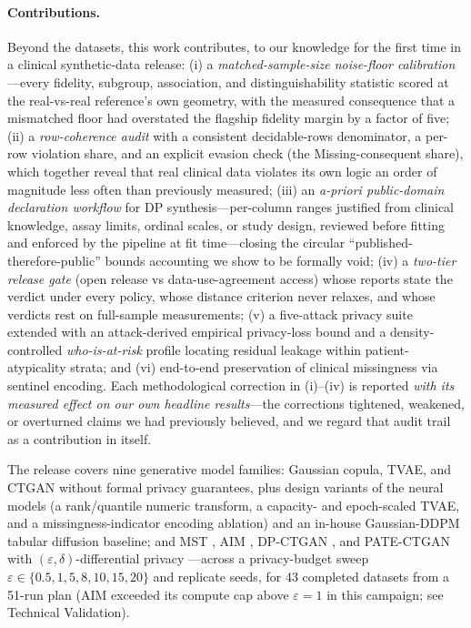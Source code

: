 \documentclass[11pt,a4paper]{article}
\newcommand{\eps}{\ensuremath{\varepsilon}}
\begin{document}
\paragraph{Contributions.} Beyond the datasets, this work contributes, to our
knowledge for the first time in a clinical synthetic-data release: (i) a
\emph{matched-sample-size noise-floor calibration}---every fidelity, subgroup,
association, and distinguishability statistic scored at the real-vs-real
reference's own geometry, with the measured consequence that a mismatched floor
had overstated the flagship fidelity margin by a factor of five; (ii) a
\emph{row-coherence audit} with a consistent decidable-rows denominator, a
per-row violation share, and an explicit evasion check (the Missing-consequent
share), which together reveal that real clinical data violates its own logic an
order of magnitude less often than previously measured; (iii) an
\emph{a-priori public-domain declaration workflow} for DP synthesis---per-column
ranges justified from clinical knowledge, assay limits, ordinal scales, or study
design, reviewed before fitting and enforced by the pipeline at fit
time---closing the circular ``published-therefore-public'' bounds accounting we
show to be formally void; (iv) a \emph{two-tier release gate} (open release vs
data-use-agreement access) whose reports state the verdict under every policy,
whose distance criterion never relaxes, and whose verdicts rest on full-sample
measurements; (v) a five-attack privacy suite extended with an attack-derived
empirical privacy-loss bound and a density-controlled \emph{who-is-at-risk}
profile locating residual leakage within patient-atypicality strata; and (vi)
end-to-end preservation of clinical missingness via sentinel encoding. Each
methodological correction in (i)--(iv) is reported \emph{with its measured
effect on our own headline results}---the corrections tightened, weakened, or
overturned claims we had previously believed, and we regard that audit trail as
a contribution in itself.

The release covers nine generative model families: Gaussian copula, TVAE, and CTGAN
\citep{patki2016sdv, xu2019modeling} without formal privacy guarantees, plus
design variants of the neural models (a rank/quantile numeric transform, a
capacity- and epoch-scaled TVAE, and a missingness-indicator encoding ablation)
and an in-house Gaussian-DDPM tabular diffusion baseline; and MST
\citep{mckenna2021winning}, AIM \citep{mckenna2022aim}, DP-CTGAN
\citep{rosenblatt2020differentially}, and PATE-CTGAN with
$(\eps, \delta)$-differential privacy \citep{dwork2014algorithmic}---across a
privacy-budget sweep $\eps \in \{0.5, 1, 5, 8, 10, 15, 20\}$ and replicate seeds,
for 43 completed datasets from a 51-run plan (AIM exceeded its compute cap above
$\eps = 1$ in this campaign; see Technical Validation).
\end{document}

